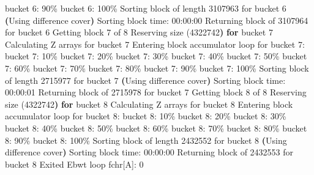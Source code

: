\documentclass[
  letterpaper,
  DIV=11,
  numbers=noendperiod]{scrartcl}
\newenvironment{Shaded}{\begin{snugshade}}{\end{snugshade}}
\newcommand{\ControlFlowTok}[1]{\textcolor[rgb]{0.00,0.23,0.31}{\textbf{#1}}}
\newcommand{\ErrorTok}[1]{\textcolor[rgb]{0.68,0.00,0.00}{#1}}
\newcommand{\ExtensionTok}[1]{\textcolor[rgb]{0.00,0.23,0.31}{#1}}
\newcommand{\KeywordTok}[1]{\textcolor[rgb]{0.00,0.23,0.31}{\textbf{#1}}}
\newcommand{\NormalTok}[1]{\textcolor[rgb]{0.00,0.23,0.31}{#1}}
\newcommand{\OperatorTok}[1]{\textcolor[rgb]{0.37,0.37,0.37}{#1}}
\newcommand{\VariableTok}[1]{\textcolor[rgb]{0.07,0.07,0.07}{#1}}
\begin{document}
\begin{Shaded}
\begin{Highlighting}[]
  \ExtensionTok{bucket}\NormalTok{ 6: 90\%}
  \ExtensionTok{bucket}\NormalTok{ 6: 100\%}
  \ExtensionTok{Sorting}\NormalTok{ block of length 3107963 for bucket 6}
  \KeywordTok{(}\ExtensionTok{Using}\NormalTok{ difference cover}\KeywordTok{)}
  \ExtensionTok{Sorting}\NormalTok{ block time: 00:00:00}
\ExtensionTok{Returning}\NormalTok{ block of 3107964 for bucket 6}
\ExtensionTok{Getting}\NormalTok{ block 7 of 8}
  \ExtensionTok{Reserving}\NormalTok{ size }\ErrorTok{(}\ExtensionTok{4322742}\KeywordTok{)} \ControlFlowTok{for}\NormalTok{ bucket }\ExtensionTok{7}
  \ExtensionTok{Calculating}\NormalTok{ Z arrays for bucket 7}
  \ExtensionTok{Entering}\NormalTok{ block accumulator loop for bucket 7:}
  \ExtensionTok{bucket}\NormalTok{ 7: 10\%}
  \ExtensionTok{bucket}\NormalTok{ 7: 20\%}
  \ExtensionTok{bucket}\NormalTok{ 7: 30\%}
  \ExtensionTok{bucket}\NormalTok{ 7: 40\%}
  \ExtensionTok{bucket}\NormalTok{ 7: 50\%}
  \ExtensionTok{bucket}\NormalTok{ 7: 60\%}
  \ExtensionTok{bucket}\NormalTok{ 7: 70\%}
  \ExtensionTok{bucket}\NormalTok{ 7: 80\%}
  \ExtensionTok{bucket}\NormalTok{ 7: 90\%}
  \ExtensionTok{bucket}\NormalTok{ 7: 100\%}
  \ExtensionTok{Sorting}\NormalTok{ block of length 2715977 for bucket 7}
  \KeywordTok{(}\ExtensionTok{Using}\NormalTok{ difference cover}\KeywordTok{)}
  \ExtensionTok{Sorting}\NormalTok{ block time: 00:00:01}
\ExtensionTok{Returning}\NormalTok{ block of 2715978 for bucket 7}
\ExtensionTok{Getting}\NormalTok{ block 8 of 8}
  \ExtensionTok{Reserving}\NormalTok{ size }\ErrorTok{(}\ExtensionTok{4322742}\KeywordTok{)} \ControlFlowTok{for}\NormalTok{ bucket }\ExtensionTok{8}
  \ExtensionTok{Calculating}\NormalTok{ Z arrays for bucket 8}
  \ExtensionTok{Entering}\NormalTok{ block accumulator loop for bucket 8:}
  \ExtensionTok{bucket}\NormalTok{ 8: 10\%}
  \ExtensionTok{bucket}\NormalTok{ 8: 20\%}
  \ExtensionTok{bucket}\NormalTok{ 8: 30\%}
  \ExtensionTok{bucket}\NormalTok{ 8: 40\%}
  \ExtensionTok{bucket}\NormalTok{ 8: 50\%}
  \ExtensionTok{bucket}\NormalTok{ 8: 60\%}
  \ExtensionTok{bucket}\NormalTok{ 8: 70\%}
  \ExtensionTok{bucket}\NormalTok{ 8: 80\%}
  \ExtensionTok{bucket}\NormalTok{ 8: 90\%}
  \ExtensionTok{bucket}\NormalTok{ 8: 100\%}
  \ExtensionTok{Sorting}\NormalTok{ block of length 2432552 for bucket 8}
  \KeywordTok{(}\ExtensionTok{Using}\NormalTok{ difference cover}\KeywordTok{)}
  \ExtensionTok{Sorting}\NormalTok{ block time: 00:00:00}
\ExtensionTok{Returning}\NormalTok{ block of 2432553 for bucket 8}
\ExtensionTok{Exited}\NormalTok{ Ebwt loop}
\VariableTok{fchr}\OperatorTok{[}\NormalTok{A}\OperatorTok{]}\ExtensionTok{:}\NormalTok{ 0}

\end{Highlighting}
\end{Shaded}
\end{document}
